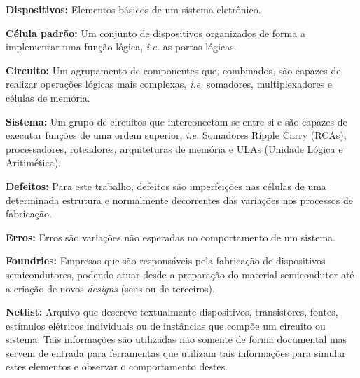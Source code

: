 \documentclass[
	12pt,				%
	twoside,			%
	a4paper,			%
	english,			%
	french,				%
	spanish,			%
	brazil				%
	]{abntex2}
\begin{document}
\begin{definicoes}
 \item \textbf{Dispositivos:} Elementos básicos de um sistema eletrônico.
 \item \textbf{Célula padrão:} Um conjunto de dispositivos organizados de forma a implementar uma função lógica, \textit{i.e.} as portas lógicas.
 \item \textbf{Circuito:} Um agrupamento de componentes que, combinados, são capazes de realizar operações lógicas mais complexas, \textit{i.e.} somadores, multiplexadores e células de memória.
 \item \textbf{Sistema:} Um grupo de circuitos que interconectam-se entre si e são capazes de executar funções de uma ordem superior, \textit{i.e.} Somadores Ripple Carry (RCAs), processadores, roteadores, arquiteturas de memória e ULAs (Unidade Lógica e Aritimética).
 \item \textbf{Defeitos:} Para este trabalho, defeitos são imperfeições nas células de uma determinada estrutura e normalmente decorrentes das variações nos processos de fabricação.
 \item \textbf{Erros:} Erros são variações não esperadas no comportamento de um sistema.
 \item \textbf{Foundries:} Empresas que são responsáveis pela fabricação de dispositivos semicondutores, podendo atuar desde a preparação do material semicondutor até a criação de novos \textit{designs} (seus ou de terceiros).
 \item \textbf{Netlist:} Arquivo que descreve textualmente dispositivos, transistores, fontes, estímulos elétricos individuais ou de instâncias que compõe um circuito ou sistema. Tais informações são utilizadas não somente de forma documental mas servem de entrada para ferramentas que utilizam tais informações para simular estes elementos e observar o comportamento destes.
\end{definicoes}

\tableofcontents*
\cleardoublepage
\end{document}
